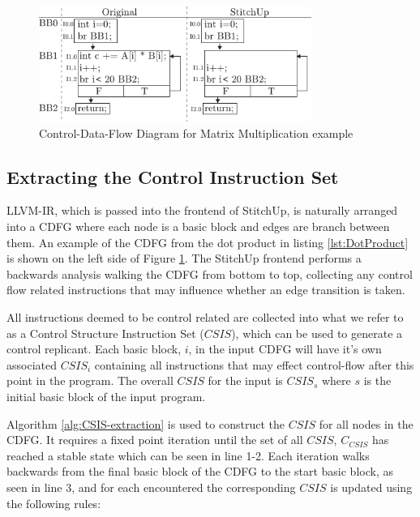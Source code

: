 \begin{figure}[t]
\centering
\includegraphics[width=3.5in]{./imgs/dot_product_cdfg.pdf}
\caption{Control-Data-Flow Diagram for Matrix Multiplication example}
\label{fig:mmm_cdfg}
\end{figure}

\subsection{Extracting the Control Instruction Set}
LLVM-IR, which is passed into the frontend of StitchUp, is naturally arranged into a CDFG
where each node is a basic block and edges are branch between them.
An example of the CDFG from the dot product in listing \ref{lst:DotProduct}
is shown on the left side of Figure \ref{fig:mmm_cdfg}.
The StitchUp frontend performs a backwards analysis walking the CDFG from bottom to top, collecting any control flow
related instructions that may influence whether an edge transition is taken.

All instructions deemed to be control related are collected into what we refer to as a Control Structure Instruction Set ($\mathit{CSIS}$),
which can be used to generate a control replicant.
Each basic block, $i$, in the input CDFG will have it's own associated $\mathit{CSIS}_{i}$ containing all instructions that may effect
control-flow after this point in the program.
The overall $\mathit{CSIS}$ for the input is $\mathit{CSIS}_s$ where $s$ is the initial basic block of the input program.

Algorithm \ref{alg:CSIS-extraction} is used to construct the $\mathit{CSIS}$ for all nodes in the CDFG.
It requires a fixed point iteration until the set of all $\mathit{CSIS}$, $C_{\mathit{CSIS}}$ has reached a stable state
which can be seen in line 1-2.
Each iteration walks backwards from the final basic block of the CDFG to the start basic block, as seen in
line 3, and for each encountered the corresponding $\mathit{CSIS}$ is updated using the following rules:

